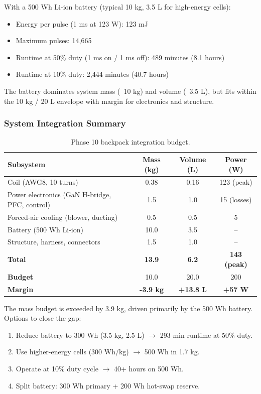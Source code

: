 With a 500 Wh Li-ion battery (typical 10 kg, 3.5 L for high-energy cells):

\begin{itemize}
    \item Energy per pulse (1 ms at 123 W): 123 mJ
    \item Maximum pulses: 14,665
    \item Runtime at 50\% duty (1 ms on / 1 ms off): 489 minutes (8.1 hours)
    \item Runtime at 10\% duty: 2,444 minutes (40.7 hours)
\end{itemize}

The battery dominates system mass (~10 kg) and volume (~3.5 L), but fits within the 10 kg / 20 L envelope with margin for electronics and structure.

\subsubsection{System Integration Summary}

\begin{table}[t]
\centering
\caption{Phase 10 backpack integration budget.}
\label{tab:phase10-backpack}
\begin{tabular}{lccc}
\hline
Subsystem & Mass (kg) & Volume (L) & Power (W) \\
\hline
Coil (AWG8, 10 turns) & 0.38 & 0.16 & 123 (peak) \\
Power electronics (GaN H-bridge, PFC, control) & 1.5 & 1.0 & 15 (losses) \\
Forced-air cooling (blower, ducting) & 0.5 & 0.5 & 5 \\
Battery (500 Wh Li-ion) & 10.0 & 3.5 & -- \\
Structure, harness, connectors & 1.5 & 1.0 & -- \\
\hline
\textbf{Total} & \textbf{13.9} & \textbf{6.2} & \textbf{143 (peak)} \\
\textbf{Budget} & 10.0 & 20.0 & 200 \\
\textbf{Margin} & \textbf{-3.9 kg} & \textbf{+13.8 L} & \textbf{+57 W} \\
\hline
\end{tabular}
\end{table}

The mass budget is exceeded by 3.9 kg, driven primarily by the 500 Wh battery. Options to close the gap:
\begin{enumerate}
    \item Reduce battery to 300 Wh (3.5 kg, 2.5 L) $\to$ 293 min runtime at 50\% duty.
    \item Use higher-energy cells (300 Wh/kg) $\to$ 500 Wh in 1.7 kg.
    \item Operate at 10\% duty cycle $\to$ 40+ hours on 500 Wh.
    \item Split battery: 300 Wh primary + 200 Wh hot-swap reserve.
\end{enumerate}

